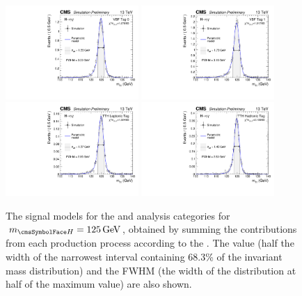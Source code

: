 \begin{figure}[ht!]
\centering
\includegraphics[width=0.45\textwidth]{modellingFigures/DCBpG/VBFTag_0.pdf} 
\includegraphics[width=0.45\textwidth]{modellingFigures/DCBpG/VBFTag_1.pdf} \\
\includegraphics[width=0.45\textwidth]{modellingFigures/DCBpG/TTHLeptonicTag.pdf} 
\includegraphics[width=0.45\textwidth]{modellingFigures/DCBpG/TTHHadronicTag.pdf} 

\caption{The signal models for the \VBFTag and \TTHTag analysis categories for $\mH=125\GeV$, obtained by summing the contributions from each production process according to the \effxacc. The \effSigma value (half the width of the narrowest interval containing 68.3\% of the invariant mass distribution) and the FWHM (the width of the distribution at half of the maximum value) are also shown.}

\label{fig:model:sig_model_per_category_exc}
\end{figure}



